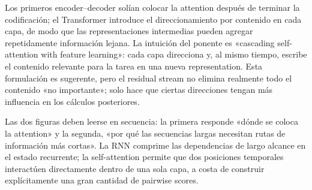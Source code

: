 Los primeros encoder--decoder solían colocar la attention después de terminar la codificación; el Transformer introduce el direccionamiento por contenido en cada capa, de modo que las representaciones intermedias pueden agregar repetidamente información lejana. La intuición del ponente es «cascading self-attention with feature learning»: cada capa direcciona y, al mismo tiempo, escribe el contenido relevante para la tarea en una nueva representation. Esta formulación es sugerente, pero el residual stream no elimina realmente todo el contenido «no importante»; solo hace que ciertas direcciones tengan más influencia en los cálculos posteriores.



Las dos figuras deben leerse en secuencia: la primera responde «dónde se coloca la attention» y la segunda, «por qué las secuencias largas necesitan rutas de información más cortas». La RNN comprime las dependencias de largo alcance en el estado recurrente; la self-attention permite que dos posiciones temporales interactúen directamente dentro de una sola capa, a costa de construir explícitamente una gran cantidad de pairwise scores.


